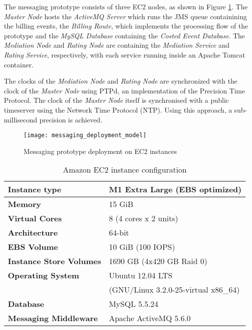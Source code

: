 The messaging prototype consists of three EC2 nodes, as shown in Figure \ref{fig:messaging_deployment_model}. The \emph{Master Node} hosts the \emph{ActiveMQ Server} which runs the JMS queue containining the billing events, the \emph{Billing Route}, which implements the processing flow of the prototype and the \emph{MySQL Database} containing the \emph{Costed Event Database}. The \emph{Mediation Node} and \emph{Rating Node} are containing the \emph{Mediation Service} and \emph{Rating Service}, respectively, with each service running inside an Apache Tomcat container.

The clocks of the \emph{Mediation Node} and \emph{Rating Node} are synchronized with the clock of the \emph{Master Node} using PTPd\cite{ptpd}, an implementation of the Precision Time Protocol\cite{IEEE_PTP}. The clock of the \emph{Master Node} itself is synchronised with a public timeserver using the Network Time Protocol (NTP). Using this approach, a sub-millisecond precision is achieved.

\begin{figure}[htbp]
	\centering
	\texttt{[image: messaging\_deployment\_model]}
	\caption{Messaging prototype deployment on EC2 instances}
	\label{fig:messaging_deployment_model}
\end{figure}

\begin{table}[htbp]
	\renewcommand{\arraystretch}{1.3}
	\caption{Amazon EC2 instance configuration}
	\label{amazon_ec2}
	\centering
	\begin{tabular}{|l|p{3.5cm}|}
		\hline
		\bfseries Instance type & M1 Extra Large (EBS optimized)\\
		\hline
		\bfseries Memory & 15 GiB\\
		\hline
		\bfseries Virtual Cores & 8 (4 cores x 2 units)\\
		\hline
		\bfseries Architecture & 64-bit\\
		\hline
		\bfseries EBS Volume & 10 GiB (100 IOPS)\\
		\hline
		\bfseries Instance Store Volumes & 1690 GB (4x420 GB Raid 0)\\
		\hline
		\bfseries Operating System & Ubuntu 12.04 LTS\\
		& (GNU/Linux 3.2.0-25-virtual x86\_64)\\
		\hline 
		\bfseries Database & MySQL 5.5.24\\
		\hline
		\bfseries Messaging Middleware & Apache ActiveMQ 5.6.0\\
		\hline
	\end{tabular}
\end{table}

